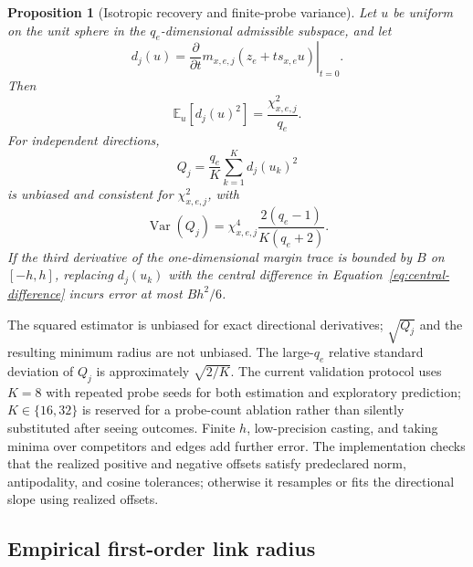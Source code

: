 \documentclass[11pt]{article}
\newtheorem{proposition}[theorem]{Proposition}
\newcommand{\E}{\mathbb E}
\begin{document}
\begin{proposition}[Isotropic recovery and finite-probe variance]
\label{prop:isotropic-recovery}
Let $u$ be uniform on the unit sphere in the $q_e$-dimensional admissible
subspace, and let
\begin{equation}
    d_j(u)
    =
    \left.\frac{\partial}{\partial t}
    m_{x,e,j}(z_e+ts_{x,e}u)\right|_{t=0}.
\end{equation}
Then
\begin{equation}
    \E_u[d_j(u)^2]
    =
    \frac{\chi_{x,e,j}^2}{q_e}.
\end{equation}
For independent directions,
\begin{equation}
    Q_j=\frac{q_e}{K}\sum_{k=1}^K d_j(u_k)^2
\end{equation}
is unbiased and consistent for \(\chi_{x,e,j}^2\), with
\begin{equation}
    \operatorname{Var}(Q_j)
    =\chi_{x,e,j}^4
    \frac{2(q_e-1)}{K(q_e+2)}.
    \label{eq:probe-variance}
\end{equation}
If the third derivative of the one-dimensional margin trace is bounded by
\(B\) on \([-h,h]\), replacing \(d_j(u_k)\) with the central difference in
Equation~\eqref{eq:central-difference} incurs error at most \(Bh^2/6\).
\end{proposition}

The squared estimator is unbiased for exact directional derivatives;
\(\sqrt{Q_j}\) and the resulting minimum radius are not unbiased. The
large-\(q_e\) relative standard deviation of \(Q_j\) is approximately
\(\sqrt{2/K}\). The current validation protocol uses $K=8$ with repeated
probe seeds for both estimation and exploratory prediction; $K\in\{16,32\}$
is reserved for a probe-count ablation rather than silently substituted after
seeing outcomes. Finite \(h\), low-precision casting, and taking minima over
competitors and edges add further error. The implementation checks that
the realized positive and negative offsets satisfy predeclared norm,
antipodality, and cosine tolerances; otherwise it resamples or fits the
directional slope using realized offsets.

\subsection{Empirical first-order link radius}
\end{document}

